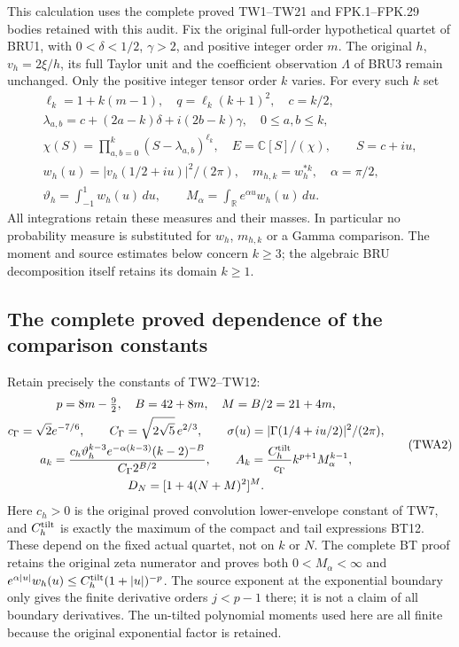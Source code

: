 \documentclass[11pt,a4paper]{article}
\begin{document}
This calculation uses the complete proved TW1--TW21 and FPK.1--FPK.29
bodies retained with this audit. Fix the original full-order hypothetical
quartet of BRU1, with $0<\delta<1/2$, $\gamma>2$, and positive integer
order $m$. The original $h$, $v_h=2\xi/h$, its full Taylor unit and
the coefficient observation $\Lambda$ of BRU3 remain unchanged.
Only the positive integer tensor order $k$ varies. For every such $k$ set
\[
\begin{gathered}
\ell_k=1+k(m-1),\quad q=\ell_k(k+1)^2,\quad c=k/2,\\
\lambda_{a,b}=c+(2a-k)\delta+i(2b-k)\gamma,
\quad 0\le a,b\le k,\\
\chi(S)=\prod_{a,b=0}^k(S-\lambda_{a,b})^{\ell_k},
\quad E=\mathbb C[S]/(\chi),\qquad S=c+iu,\\
w_h(u)=|v_h(1/2+iu)|^2/(2\pi),\quad
m_{h,k}=w_h^{*k},\quad \alpha=\pi/2,\\
\vartheta_h=\int_{-1}^1w_h(u)\,du,\qquad
M_\alpha=\int_{\mathbb R}e^{\alpha u}w_h(u)\,du.
\end{gathered}\tag{TWA1}
\]
All integrations retain these measures and their masses. In particular
no probability measure is substituted for $w_h$, $m_{h,k}$ or a Gamma
comparison. The moment and source estimates below concern $k\ge3$;
the algebraic BRU decomposition itself retains its domain $k\ge1$.

\subsection{The complete proved dependence of the comparison constants}

Retain precisely the constants of TW2--TW12:
\[
\begin{gathered}
p=8m-\tfrac92,\quad B=42+8m,\quad M=B/2=21+4m,\\
c_\Gamma=\sqrt2e^{-7/6},\qquad
C_\Gamma=\sqrt{2\sqrt5}\,e^{2/3},\qquad
\sigma(u)=|\Gamma(1/4+iu/2)|^2/(2\pi),\\
a_k=\frac{c_h\vartheta_h^{k-3}e^{-\alpha(k-3)}(k-2)^{-B}}
{C_\Gamma2^{B/2}},\qquad
A_k=\frac{C_h^{\rm tilt}}{c_\Gamma}k^{p+1}M_\alpha^{k-1},\\
D_N=[1+4(N+M)^2]^M.
\end{gathered}\tag{TWA2}
\]
Here $c_h>0$ is the original proved convolution lower-envelope
constant of TW7, and $C_h^{\rm tilt}$ is exactly the maximum of the
compact and tail expressions BT12. These depend on the fixed actual
quartet, not on $k$ or $N$. The complete BT proof retains the original
zeta numerator and proves both $0<M_\alpha<\infty$ and
$e^{\alpha|u|}w_h(u)\le C_h^{\rm tilt}(1+|u|)^{-p}$.
The source exponent at the exponential boundary only gives the
finite derivative orders $j<p-1$ there; it is not a claim of all
boundary derivatives. The un-tilted polynomial moments used here are
all finite because the original exponential factor is retained.
\end{document}
